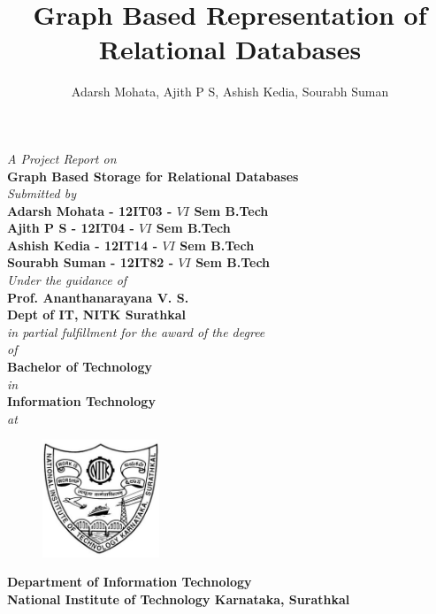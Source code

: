 \documentclass[12pt, oneside]{book}
\title{Graph Based Representation of Relational Databases}
\author{Adarsh Mohata, Ajith P S, Ashish Kedia, Sourabh Suman}
\newcommand{\project}{Graph Based Storage for Relational Databases}
\begin{document}
\begin{titlepage}
 \begin{center}
	\emph{A Project Report on} \\
\vspace{1cm}
\large
\textbf{\project} \\
\normalsize
\vspace{5mm}
\emph{Submitted by} \\
\vspace{5mm}
\textbf{Adarsh Mohata - 12IT03 - $VI$ Sem B.Tech} \\
\vspace{1mm}
\textbf{Ajith P S - 12IT04 - $VI$ Sem B.Tech} \\
\vspace{1mm}
\textbf{Ashish Kedia - 12IT14 - $VI$ Sem B.Tech} \\
\vspace{1mm}
\textbf{Sourabh Suman - 12IT82 - $VI$ Sem B.Tech} \\
\vspace{1cm}
\emph{Under the guidance of} \\
\vspace{1cm}
\textbf{Prof. Ananthanarayana V. S.} \\
\textbf{Dept of IT, NITK Surathkal} \\
\vspace{5mm}
\emph{in partial fulfillment for the award of the degree} \\
\vspace{5mm}
\emph{of} \\
\vspace{4mm}
\textbf{Bachelor of Technology} \\
\vspace{4mm}
\emph{in} \\
\vspace{4mm}
\textbf{Information Technology} \\
\vspace{5mm}
\emph{at} \\
\begin{figure}[H]
	\centering
	\includegraphics[height=3.5cm]{pics/nitk_logo.jpg}
\end{figure}
\vspace{1cm}
\textbf{Department of Information Technology} \\
\vspace{5mm}
\textbf{National Institute of Technology Karnataka, Surathkal} \\
\vspace{5mm}
\end{center}
\end{titlepage}
\end{document}
